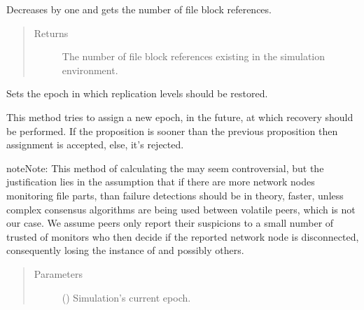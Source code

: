 \documentclass[letterpaper,10pt,english]{sphinxmanual}
\begin{document}
\begin{fulllineitems}
\begin{fulllineitems}
\end{fulllineitems}


\begin{fulllineitems}
\label{\detokenize{app.domain.helpers:app.domain.helpers.smart_dataclasses.FileBlockData.decrement_and_get_references}}
Decreases by one and gets the number of file block references.
\begin{quote}\begin{description}
\item[{Returns}] \leavevmode
The number of file block references existing in the simulation
environment.

\end{description}\end{quote}

\end{fulllineitems}


\begin{fulllineitems}
\label{\detokenize{app.domain.helpers:app.domain.helpers.smart_dataclasses.FileBlockData.set_replication_epoch}}
Sets the epoch in which replication levels should be restored.

This method tries to assign a new epoch, in the future, at which
recovery should be performed. If the proposition is sooner than the
previous proposition then assignment is accepted, else, it’s rejected.

\begin{sphinxadmonition}{note}{Note:}
This method of calculating the  may seem
controversial, but the justification lies in the assumption that
if there are more network nodes monitoring file parts,
than failure detections should be in theory, faster, unless
complex consensus algorithms are being used between volatile
peers, which is not our case. We assume peers only report their
suspicions to a small number of trusted of monitors who then
decide if the reported network node is disconnected, consequently
losing the instance of  and possibly others.
\end{sphinxadmonition}
\begin{quote}\begin{description}
\item[{Parameters}] \leavevmode
{} () \textendash{} Simulation’s current epoch.


\end{description}
\end{quote}
\end{fulllineitems}
\end{fulllineitems}
\end{document}
